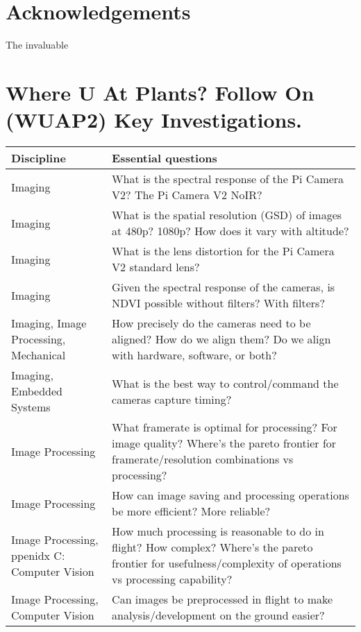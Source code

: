 \documentclass[conference]{IEEEtran} %
\begin{document}
\section*{Acknowledgements}
The invaluable






\onecolumn
\appendices{}


\section{Where U At Plants? Follow On (WUAP2) Key Investigations.}
\noindent
\begin{table}
\begin{tabularx}{\linewidth}{@{}p{}X@{}}
    \textbf{Discipline} & \textbf{Essential questions} \\
    \midrule
    Imaging & What is the spectral response of the Pi Camera V2? The Pi Camera V2 NoIR? \\
    Imaging & What is the spatial resolution (GSD) of images at 480p? 1080p? How does it vary with altitude? \\
    Imaging & What is the lens distortion for the Pi Camera V2 standard lens? \\
    Imaging & Given the spectral response of the cameras, is NDVI possible without filters? With filters? \\
    Imaging, Image Processing, Mechanical & How precisely do the cameras need to be aligned? How do we align them? Do we align with hardware, software, or both? \\
    Imaging, Embedded Systems & What is the best way to control/command the cameras capture timing? \\
    Image Processing & What framerate is optimal for processing? For image quality? Where's the pareto frontier for framerate/resolution combinations vs processing? \\
    Image Processing & How can image saving and processing operations be more efficient? More reliable? \\
    Image Processing, ppenidx C: Computer Vision & How much processing is reasonable to do in flight? How complex? Where's the pareto frontier for usefulness/complexity of operations vs processing capability? \\
    Image Processing, Computer Vision & Can images be preprocessed in flight to make analysis/development on the ground easier? \\

\end{tabularx}
\end{table}
\end{document}
